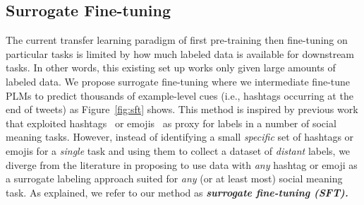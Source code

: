 \subsection{Surrogate Fine-tuning}\label{sec:surrogate_ft}
The current transfer learning paradigm of first pre-training then fine-tuning on particular tasks is limited by how much labeled data is available for downstream tasks. In other words, this existing set up works only given large amounts of labeled data. We propose surrogate fine-tuning where we intermediate fine-tune PLMs to predict thousands of example-level cues (i.e., hashtags occurring at the end of tweets) as Figure~\ref{fig:sft} shows. This method is inspired by previous work that exploited hashtags~\cite{riloff2013sarcasm,ptavcek2014sarcasm,rajadesingan2015sarcasm,sintsova-2016-dystemo,abdul-2017-emonet,barbieri-2018-semeval} or emojis~\cite{wood2016emoji,felbo-2017-using,wiegand-2021-exploiting} as proxy for labels in a number of social meaning tasks. %
However, instead of identifying a small \textit{specific} set of hashtags or emojis for a \textit{single} task and using them to collect a dataset of \textit{distant} labels, we diverge from the literature in proposing to use data with \textit{any} hashtag or emoji as a surrogate labeling approach suited for \textit{any} (or at least most) social meaning task. %
As explained, we refer to our method as \textbf{\textit{surrogate fine-tuning (SFT).}}